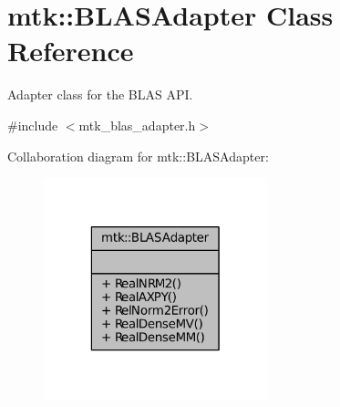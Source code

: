 \hypertarget{classmtk_1_1BLASAdapter}{\section{mtk\-:\-:B\-L\-A\-S\-Adapter Class Reference}
\label{classmtk_1_1BLASAdapter}
}


Adapter class for the B\-L\-A\-S A\-P\-I.  




{\ttfamily \#include $<$mtk\-\_\-blas\-\_\-adapter.\-h$>$}



Collaboration diagram for mtk\-:\-:B\-L\-A\-S\-Adapter\-:\nopagebreak
\begin{figure}[H]
\begin{center}
\leavevmode
\includegraphics[width=184pt]{classmtk_1_1BLASAdapter__coll__graph}
\end{center}
\end{figure}
